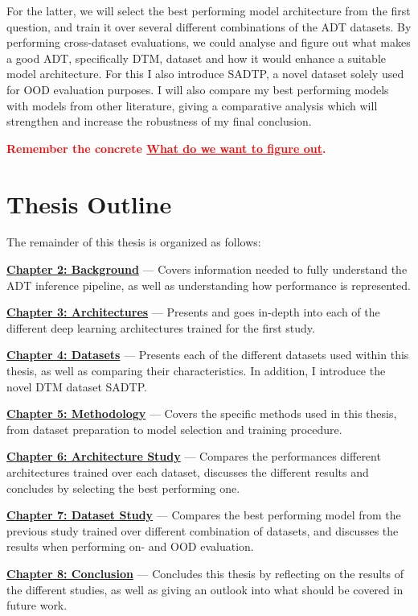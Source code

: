 For the latter, we will select the best performing model architecture from the first question, and train it over several different combinations of the \gls{ADT} datasets. By performing cross-dataset evaluations, we could analyse and figure out what makes a good \gls{ADT}, specifically \gls{DTM}, dataset and how it would enhance a suitable model architecture. For this I also introduce SADTP, a novel dataset solely used for \gls{OOD} evaluation purposes. I will also compare my best performing models with models from other literature, giving a comparative analysis which will strengthen and increase the robustness of my final conclusion.

\textcolor{red}{\textbf{Remember the concrete \underline{What do we want to figure out}.}}

\section{Thesis Outline}

The remainder of this thesis is organized as follows:

\noindent \hyperref[Background]{\textbf{Chapter 2: Background}} — Covers information needed to fully understand the \gls{ADT} inference pipeline, as well as understanding how performance is represented.

\noindent \hyperref[Architectures]{\textbf{Chapter 3: Architectures}} — Presents and goes in-depth into each of the different deep learning architectures trained for the first study.

\noindent \hyperref[Datasets]{\textbf{Chapter 4: Datasets}} — Presents each of the different datasets used within this thesis, as well as comparing their characteristics. In addition, I introduce the novel \gls{DTM} dataset SADTP.

\noindent \hyperref[Methodology]{\textbf{Chapter 5: Methodology}} — Covers the specific methods used in this thesis, from dataset preparation to model selection and training procedure.

\noindent \hyperref[Study1]{\textbf{Chapter 6: Architecture Study}} — Compares the performances different architectures trained over each dataset, discusses the different results and concludes by selecting the best performing one.

\noindent \hyperref[Study2]{\textbf{Chapter 7: Dataset Study}} — Compares the best performing model from the previous study trained over different combination of datasets, and discusses the results when performing on- and \gls{OOD} evaluation.

\noindent \hyperref[Conclusion]{\textbf{Chapter 8: Conclusion}} — Concludes this thesis by reflecting on the results of the different studies, as well as giving an outlook into what should be covered in future work.